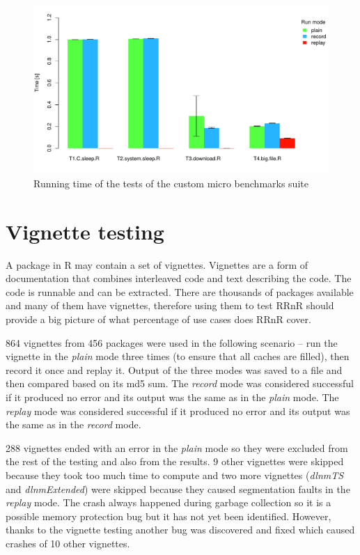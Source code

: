 \documentclass[thesis=M,english,hidelinks]{FITthesis}[2012/10/20]
\begin{document}
		\begin{figure}[ht]\centering
			\setlength{\abovecaptionskip}{-5pt}
			\includegraphics[width=1.0\textwidth]{benchmarks/custom/plot_running_time}
			\caption{Running time of the tests of the custom micro benchmarks suite}
		\end{figure}
	
	\section{Vignette testing}
	A package in R may contain a set of vignettes. Vignettes are a form of documentation that combines interleaved code and text describing the code. The code is runnable and can be extracted. There are thousands of packages available and many of them have vignettes, therefore using them to test RRnR should provide a big picture of what percentage of use cases does RRnR cover.\par
	
	864 vignettes from 456 packages were used in the following scenario -- run the vignette in the \emph{plain} mode three times (to ensure that all caches are filled), then record it once and replay it. Output of the three modes was saved to a file and then compared based on its md5 sum. The \emph{record} mode was considered successful if it produced no error and its output was the same as in the \emph{plain} mode. The \emph{replay} mode was considered successful if it produced no error and its output was the same as in the \emph{record} mode.\par
	
	288 vignettes ended with an error in the \emph{plain} mode so they were excluded from the rest of the testing and also from the results. 9 other vignettes were skipped because they took too much time to compute and two more vignettes (\emph{dlnmTS} and \emph{dlnmExtended}) were skipped because they caused segmentation faults in the \emph{replay} mode. The crash always happened during garbage collection so it is a possible memory protection bug but it has not yet been identified. However, thanks to the vignette testing another bug was discovered and fixed which caused crashes of 10 other vignettes.\par
	
\end{document}
